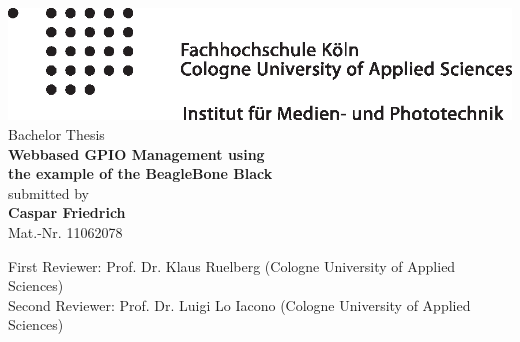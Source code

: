 \begin{otherlanguage}{english}

\begin{titlepage}
\begin{center}

\includegraphics[width = \textwidth]{images/imp_rechts.eps}\\[3cm]

Bachelor Thesis\\[0.5cm]
{\sffamily \bfseries \Huge Webbased GPIO Management using\\[0.25cm]
the example of the BeagleBone Black}\\[2cm]

submitted by\\[0.5cm]
\textbf{Caspar Friedrich}\\[0.5cm]
Mat.-Nr. 11062078\\[0.5cm]

\vfill

First Reviewer: Prof. Dr. Klaus Ruelberg (Cologne University of Applied Sciences)\\[0.5cm]
Second Reviewer: Prof. Dr. Luigi Lo Iacono (Cologne University of Applied Sciences)\\[0.5cm]
\monthname ~\the\year

\end{center}
\end{titlepage}

\end{otherlanguage}